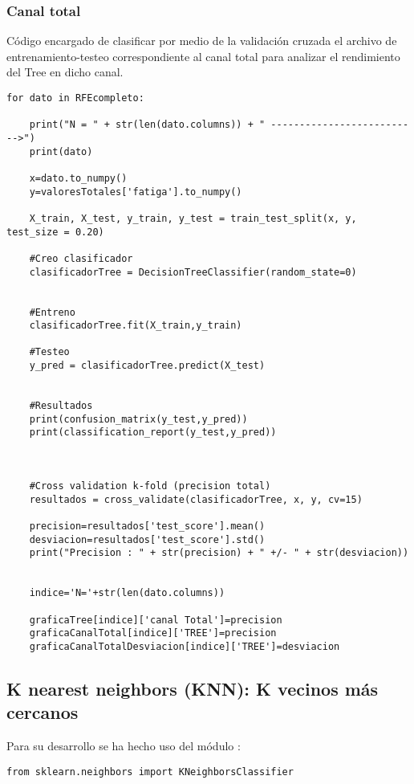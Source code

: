     \subsubsection{Canal total}
Código encargado de clasificar por medio de la validación cruzada el archivo de entrenamiento-testeo correspondiente al canal total para analizar el rendimiento del Tree en dicho canal.
\begin{lstlisting}
for dato in RFEcompleto:
    
    print("N = " + str(len(dato.columns)) + " -------------------------->")
    print(dato)

    x=dato.to_numpy()
    y=valoresTotales['fatiga'].to_numpy()

    X_train, X_test, y_train, y_test = train_test_split(x, y, test_size = 0.20)

    #Creo clasificador
    clasificadorTree = DecisionTreeClassifier(random_state=0)


    #Entreno
    clasificadorTree.fit(X_train,y_train)

    #Testeo 
    y_pred = clasificadorTree.predict(X_test)


    #Resultados
    print(confusion_matrix(y_test,y_pred))
    print(classification_report(y_test,y_pred))



    #Cross validation k-fold (precision total)
    resultados = cross_validate(clasificadorTree, x, y, cv=15)
    
    precision=resultados['test_score'].mean()
    desviacion=resultados['test_score'].std()
    print("Precision : " + str(precision) + " +/- " + str(desviacion))
    
    
    indice='N='+str(len(dato.columns))
    
    graficaTree[indice]['canal Total']=precision
    graficaCanalTotal[indice]['TREE']=precision
    graficaCanalTotalDesviacion[indice]['TREE']=desviacion
\end{lstlisting}


\subsection{K nearest neighbors (KNN): K vecinos más cercanos}
Para su desarrollo se ha hecho uso del módulo \cite{scikitKNN}:
\begin{lstlisting}
from sklearn.neighbors import KNeighborsClassifier
\end{lstlisting}

